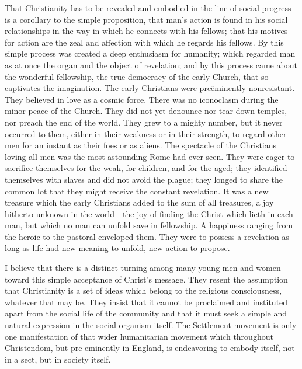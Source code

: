 That Christianity has to be revealed and embodied in the line of
social progress is a corollary to the simple proposition, that man's
action is found in his social  relationships in the way in
which he connects with his fellows; that his motives for action are
the zeal and affection with which he regards his fellows. By this
simple process was created a deep enthusiasm for humanity; which
regarded man as at once the organ and the object of revelation; and by
this process came about the wonderful fellowship, the true democracy
of the early Church, that so captivates the imagination. The early
Christians were pre\"{e}minently nonresistant. They believed in love
as a cosmic force. There was no iconoclasm during the minor peace of
the Church. They did not yet denounce nor tear down temples, nor
preach the end of the world. They grew to a mighty number, but it
never occurred to them, either in their weakness or in their strength,
to regard other men for an instant as their foes or as aliens. The
spectacle of the Christians loving all men was the most astounding
Rome had ever seen. They were eager to sacrifice themselves for the
weak, for children, and for the aged; they identified themselves with
slaves and did not avoid the plague; they longed to share the common
lot that they might receive the constant revelation. It was a new
treasure which the early Christians added to the sum of all treasures,
a joy hitherto unknown in the world---the joy of finding the Christ
which lieth in each man, but which no man can unfold save in
fellowship. A happiness ranging from the heroic to the pastoral
enveloped them. They were to possess a revelation as long as life had
new meaning to unfold, new action to propose.

I believe that there is a distinct turning among many young men and
women toward this simple acceptance of Christ's message. They resent
the  assumption that Christianity is a set of ideas which
belong to the religious consciousness, whatever that may be. They
insist that it cannot be proclaimed and instituted apart from the
social life of the community and that it must seek a simple and
natural expression in the social organism itself. The Settlement
movement is only one manifestation of that wider humanitarian movement
which throughout Christendom, but pre-eminently in England, is
endeavoring to embody itself, not in a sect, but in society itself.

